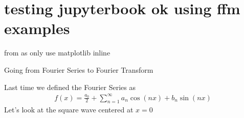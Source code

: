 \documentclass[letterpaper,10pt,english]{jupyterBook}
\begin{document}
\chapter{testing jupyter\sphinxhyphen{}book ok using ffm examples}
\label{\detokenize{ffm:testing-jupyter-book-ok-using-ffm-examples}}\label{\detokenize{ffm::doc}}
\sphinxAtStartPar
from 
as only use matplotlib inline

\sphinxAtStartPar
Going from Fourier Series to Fourier Transform

\sphinxAtStartPar
Last time we defined the Fourier Series as
\begin{equation*}
\begin{split}
f(x) = \frac{a_0}{2} + \sum_{n=1}^{\infty} a_n \cos(nx) + b_n \sin(nx)
\end{split}
\end{equation*}
\sphinxAtStartPar
Let’s look at the square wave centered at \(x=0\)
\end{document}
